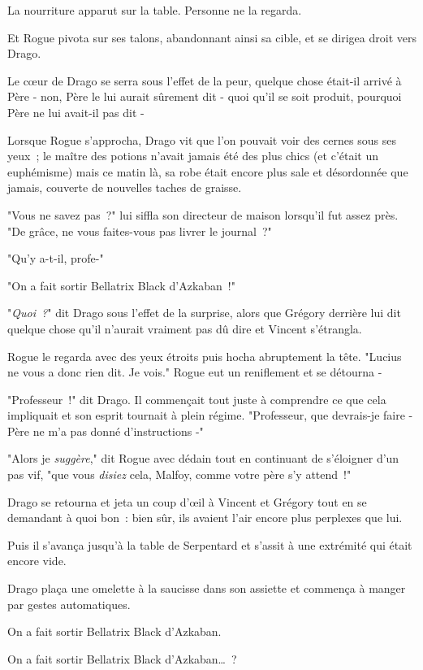 La nourriture apparut sur la table. Personne ne la regarda.

Et Rogue pivota sur ses talons, abandonnant ainsi sa cible, et se dirigea droit vers Drago.

Le cœur de Drago se serra sous l'effet de la peur, quelque chose était-il arrivé à Père - non, Père le lui aurait sûrement dit - quoi qu'il se soit produit, pourquoi Père ne lui avait-il pas dit -

Lorsque Rogue s'approcha, Drago vit que l'on pouvait voir des cernes sous ses yeux~; le maître des potions n'avait jamais été des plus chics (et c'était un euphémisme) mais ce matin là, sa robe était encore plus sale et désordonnée que jamais, couverte de nouvelles taches de graisse.

"Vous ne savez pas~?" lui siffla son directeur de maison lorsqu'il fut assez près. "De grâce, ne vous faites-vous pas livrer le journal~?"

"Qu'y a-t-il, profe-"

"On a fait sortir Bellatrix Black d'Azkaban~!"

"\emph{Quoi~?}" dit Drago sous l'effet de la surprise, alors que Grégory derrière lui dit quelque chose qu'il n'aurait vraiment pas dû dire et Vincent s'étrangla.

Rogue le regarda avec des yeux étroits puis hocha abruptement la tête. "Lucius ne vous a donc rien dit. Je vois." Rogue eut un reniflement et se détourna -

"Professeur~!" dit Drago. Il commençait tout juste à comprendre ce que cela impliquait et son esprit tournait à plein régime. "Professeur, que devrais-je faire - Père ne m'a pas donné d'instructions -"

"Alors je \emph{suggère}," dit Rogue avec dédain tout en continuant de s'éloigner d'un pas vif, "que vous \emph{disiez} cela, Malfoy, comme votre père s'y attend~!"

Drago se retourna et jeta un coup d'œil à Vincent et Grégory tout en se demandant à quoi bon~: bien sûr, ils avaient l'air encore plus perplexes que lui.

Puis il s'avança jusqu'à la table de Serpentard et s'assit à une extrémité qui était encore vide.

Drago plaça une omelette à la saucisse dans son assiette et commença à manger par gestes automatiques.

On a fait sortir Bellatrix Black d'Azkaban.

On a fait sortir Bellatrix Black d'Azkaban…~?

